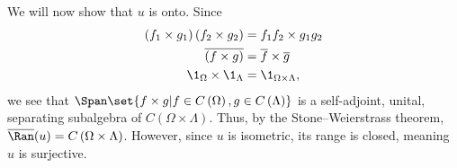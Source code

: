 \documentclass[10pt]{mypackage}
\begin{document}
\begin{example}
  We will now show that $u$ is onto. Since
  \begin{align*}
    \left(f_1\times g_1\right)\left(f_2\times g_2\right) &= f_1f_2\times g_1g_2\\
    \overline{\left(f\times g\right)} &= \overline{f}\times \overline{g}\\
    \1_{\Omega}\times\1_{\Lambda} &= \1_{\Omega\times\Lambda},
  \end{align*}
  we see that $\Span\set{f\times g| f\in C\left(\Omega\right),g\in C\left(\Lambda\right)}$ is a self-adjoint, unital, separating subalgebra of $C\left(\Omega\times\Lambda\right)$. Thus, by the Stone--Weierstrass theorem, $\overline{\Ran}(u) = C\left(\Omega\times\Lambda\right)$. However, since $u$ is isometric, its range is closed, meaning $u$ is surjective.
\end{example}
\end{document}
